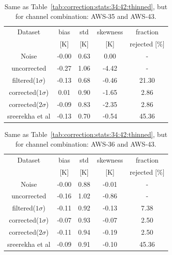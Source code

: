 \documentclass[12pt]{article}
\begin{document}
\begin{table}[!p]
	\centering
	\begin{tabular}[b]{c|c|c|c|c}
		Dataset  		  &   bias &   std &   skewness & fraction \\
							&   [K]  &   [K] & [K] & rejected [\%]\\
		\hline
 Noise           	  &  -0.00 &  0.63 &               0.00 &                -\\
uncorrected     	  &  -0.27 &  1.06 &              -4.42 &                - \\
filtered($1\sigma$)	  &  -0.13 &  0.68 &              -0.46 &               21.30 \\
corrected($1\sigma$)  &   0.01 &  0.90 &              -1.65 &                2.86 \\
corrected($2\sigma$)  &  -0.09 &  0.83 &              -2.35 &                2.86 \\
sreerekha et al  	  &  -0.13 &  0.70 &              -0.54 &               45.36 \\
		\hline
	\end{tabular}
	\caption{Same as Table~\ref{tab:correction:stats:34:42:thinned}, but for channel combination: AWS-35 and AWS-43.   }
	\label{tab:correction:stats:35:43}
\end{table}

\begin{table}[!p]
	\centering
	\begin{tabular}[b]{c|c|c|c|c}
		Dataset  		  &   bias &   std &   skewness & fraction  \\
							&   [K]  &   [K] & [K] & rejected [\%]\\
		\hline
 Noise            	 &  -0.00 &  0.88 &              -0.01 &               - \\
uncorrected      	 &  -0.16 &  1.02 &              -0.86 &                - \\
filtered($1\sigma$)  &  -0.11 &  0.92 &              -0.13 &                7.38 \\
corrected($1\sigma$) &  -0.07 &  0.93 &              -0.07 &                2.50 \\
corrected($2\sigma$) &  -0.11 &  0.94 &              -0.19 &                2.50 \\
sreerekha et al 	 &  -0.09 &  0.91 &              -0.10 &               45.36 \\
		\hline
	\end{tabular}
	\caption{Same as Table~\ref{tab:correction:stats:34:42:thinned}, but for channel combination: AWS-36 and AWS-43.   }
	\label{tab:correction:stats:36:43}
\end{table}
\end{document}
